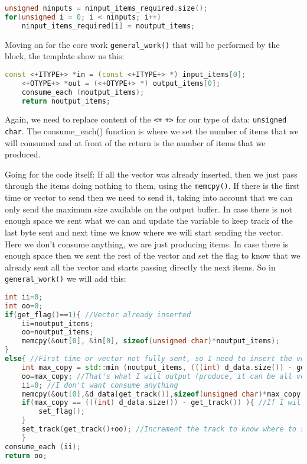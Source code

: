 \documentclass[a4paper, 10pt, conference]{ieeeconf}      %
\begin{document}
\begin{lstlisting}[language=c++, breaklines]    
unsigned ninputs = ninput_items_required.size();
for(unsigned i = 0; i < ninputs; i++)
    ninput_items_required[i] = noutput_items;
\end{lstlisting}
    
    Moving on for the core work \verb|general_work()| that will be performed by the block, the template show us this:

\begin{lstlisting}[language=c++, breaklines]    
    const <+ITYPE+> *in = (const <+ITYPE+> *) input_items[0];
    <+OTYPE+> *out = (<+OTYPE+> *) output_items[0];
    consume_each (noutput_items);
    return noutput_items;

\end{lstlisting}

    Again, we need to replace content of the \verb|<+| \verb|+>| for our type of data: \verb|unsigned char|. The consume\_each() function is where we set the number of items that we will consumed and at front of the return is the number of items that we produced.
    
    Going for the code itself:
    If all the vector was already inserted, then we just pass through the items doing nothing to them, using the \verb|memcpy()|.
    If there is the first time or vector to send then we need to send it, taking into account that we can only send the maximum size available on the output buffer. In case there is not enough space we sent what we can and update the variable to keep track of the last byte sent and next time we know where we will start sending the vector. Here we don't consume anything, we are just producing items. In case there is enough space then we sent the rest of the vector and set the flag to know that we already sent all the vector and starts passing directly the next items.
    So in \verb|general_work()| we will add this:

\begin{lstlisting}[language=c++, breaklines]
int ii=0;
int oo=0;
if(get_flag()==1){ //Vector already inserted
    ii=noutput_items;
    oo=noutput_items;
    memcpy(&out[0], &in[0], sizeof(unsigned char)*noutput_items);
}
else{ //First time or vector not fully sent, so I need to insert the vector
    int max_copy = std::min (noutput_items, (((int) d_data.size()) - get_track()) ); //Check for space in buffers to use the remaining vector (len(vec) - used)
    oo=max_copy; //That's what I will output (produce, it can be all vector or all buffer)
    ii=0; //I don't want consume anything
    memcpy(&out[0],&d_data[get_track()],sizeof(unsigned char)*max_copy); //Output starting from where I stopped the last time (Starting with 0)
    if(max_copy == (((int) d_data.size()) - get_track()) ){ //If I will use last piece of the vector (len(vec)-used) then I can set the flag to get out. (Start passing directly)
        set_flag();
    }
    set_track(get_track()+oo); //Increment the track to know where to start copying the vector the next time (Where I was plus what I will produce now) 
    }
consume_each (ii);
return oo;
\end{lstlisting}
\end{document}
